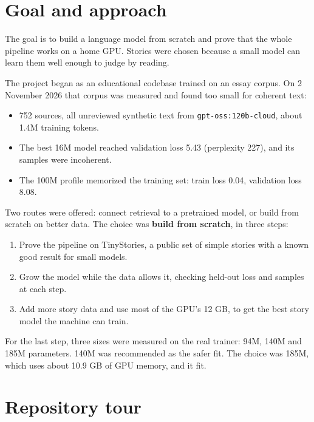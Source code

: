 \documentclass[11pt,a4paper]{article}
\newcommand{\code}[1]{\texttt{#1}}
\begin{document}
\section*{Goal and approach}
{}

The goal is to build a language model from scratch and prove that the whole pipeline works on a home GPU. Stories were chosen because a small model can learn them well enough to judge by reading.

The project began as an educational codebase trained on an essay corpus. On 2 November 2026 that corpus was measured and found too small for coherent text:

\begin{itemize}
\item 752 sources, all unreviewed synthetic text from \code{gpt-\allowbreak{}oss:120b-\allowbreak{}cloud}, about 1.4M training tokens.
\item The best 16M model reached validation loss 5.43 (perplexity 227), and its samples were incoherent.
\item The 100M profile memorized the training set: train loss 0.04, validation loss 8.08.
\end{itemize}

Two routes were offered: connect retrieval to a pretrained model, or build from scratch on better data. The choice was \textbf{build from scratch}, in three steps:

\begin{enumerate}
\item Prove the pipeline on TinyStories, a public set of simple stories with a known good result for small models.
\item Grow the model while the data allows it, checking held-out loss and samples at each step.
\item Add more story data and use most of the GPU's 12 GB, to get the best story model the machine can train.
\end{enumerate}

For the last step, three sizes were measured on the real trainer: 94M, 140M and 185M parameters. 140M was recommended as the safer fit. The choice was 185M, which uses about 10.9 GB of GPU memory, and it fit.

\section*{Repository tour}
{}
\end{document}
